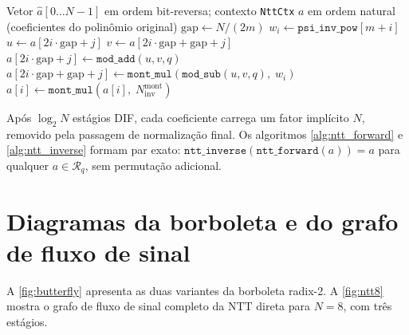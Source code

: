 \documentclass[11pt,a4paper]{report}
\newcommand{\Rq}{\mathcal{R}_q}
\begin{document}
\begin{algorithm}[ht]
\caption{\texttt{ntt\_inverse}: NTT negacíclica inversa (Gentleman--Sande DIF)}
\label{alg:ntt_inverse}
\begin{algorithmic}[1]
\Require Vetor $\hat{a}[0\ldots N-1]$ em ordem bit-reversa;\; contexto \texttt{NttCtx}
\Ensure $a$ em ordem natural (coeficientes do polinômio original)
  \State $\text{gap} \gets N / (2m)$
    \State $w_i \gets \texttt{psi\_inv\_pow}[m + i]$
      \State $u \gets a[2i \cdot \text{gap} + j]$
      \State $v \gets a[2i \cdot \text{gap} + \text{gap} + j]$
      \State $a[2i \cdot \text{gap} + j]            \gets \texttt{mod\_add}(u, v, q)$
      \State $a[2i \cdot \text{gap} + \text{gap} + j] \gets
        \texttt{mont\_mul}(\texttt{mod\_sub}(u, v, q),\; w_i)$
    \EndFor
  \EndFor
\EndFor
{}
  \State $a[i] \gets \texttt{mont\_mul}(a[i],\; N_{\text{inv}}^{\text{mont}})$
\EndFor
\end{algorithmic}
\end{algorithm}

Após $\log_2 N$ estágios DIF, cada coeficiente carrega um fator implícito $N$, removido
pela passagem de normalização final. Os algoritmos \cref{alg:ntt_forward} e
\cref{alg:ntt_inverse} formam par exato: $\texttt{ntt\_inverse}(\texttt{ntt\_forward}(a)) = a$
para qualquer $a \in \Rq$, sem permutação adicional.

\section{Diagramas da borboleta e do grafo de fluxo de sinal}
\label{sec:ntt_diagrams}

A \cref{fig:butterfly} apresenta as duas variantes da borboleta radix-2. A
\cref{fig:ntt8} mostra o grafo de fluxo de sinal completo da NTT direta para $N=8$,
com três estágios.
\end{document}
